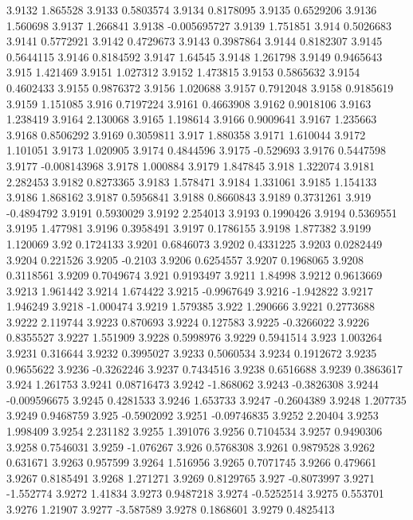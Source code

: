 3.9132  1.865528
3.9133  0.5803574
3.9134  0.8178095
3.9135  0.6529206
3.9136  1.560698
3.9137  1.266841
3.9138  -0.005695727
3.9139  1.751851
3.914  0.5026683
3.9141  0.5772921
3.9142  0.4729673
3.9143  0.3987864
3.9144  0.8182307
3.9145  0.5644115
3.9146  0.8184592
3.9147  1.64545
3.9148  1.261798
3.9149  0.9465643
3.915  1.421469
3.9151  1.027312
3.9152  1.473815
3.9153  0.5865632
3.9154  0.4602433
3.9155  0.9876372
3.9156  1.020688
3.9157  0.7912048
3.9158  0.9185619
3.9159  1.151085
3.916  0.7197224
3.9161  0.4663908
3.9162  0.9018106
3.9163  1.238419
3.9164  2.130068
3.9165  1.198614
3.9166  0.9009641
3.9167  1.235663
3.9168  0.8506292
3.9169  0.3059811
3.917  1.880358
3.9171  1.610044
3.9172  1.101051
3.9173  1.020905
3.9174  0.4844596
3.9175  -0.529693
3.9176  0.5447598
3.9177  -0.008143968
3.9178  1.000884
3.9179  1.847845
3.918  1.322074
3.9181  2.282453
3.9182  0.8273365
3.9183  1.578471
3.9184  1.331061
3.9185  1.154133
3.9186  1.868162
3.9187  0.5956841
3.9188  0.8660843
3.9189  0.3731261
3.919  -0.4894792
3.9191  0.5930029
3.9192  2.254013
3.9193  0.1990426
3.9194  0.5369551
3.9195  1.477981
3.9196  0.3958491
3.9197  0.1786155
3.9198  1.877382
3.9199  1.120069
3.92  0.1724133
3.9201  0.6846073
3.9202  0.4331225
3.9203  0.0282449
3.9204  0.221526
3.9205  -0.2103
3.9206  0.6254557
3.9207  0.1968065
3.9208  0.3118561
3.9209  0.7049674
3.921  0.9193497
3.9211  1.84998
3.9212  0.9613669
3.9213  1.961442
3.9214  1.674422
3.9215  -0.9967649
3.9216  -1.942822
3.9217  1.946249
3.9218  -1.000474
3.9219  1.579385
3.922  1.290666
3.9221  0.2773688
3.9222  2.119744
3.9223  0.870693
3.9224  0.127583
3.9225  -0.3266022
3.9226  0.8355527
3.9227  1.551909
3.9228  0.5998976
3.9229  0.5941514
3.923  1.003264
3.9231  0.316644
3.9232  0.3995027
3.9233  0.5060534
3.9234  0.1912672
3.9235  0.9655622
3.9236  -0.3262246
3.9237  0.7434516
3.9238  0.6516688
3.9239  0.3863617
3.924  1.261753
3.9241  0.08716473
3.9242  -1.868062
3.9243  -0.3826308
3.9244  -0.009596675
3.9245  0.4281533
3.9246  1.653733
3.9247  -0.2604389
3.9248  1.207735
3.9249  0.9468759
3.925  -0.5902092
3.9251  -0.09746835
3.9252  2.20404
3.9253  1.998409
3.9254  2.231182
3.9255  1.391076
3.9256  0.7104534
3.9257  0.9490306
3.9258  0.7546031
3.9259  -1.076267
3.926  0.5768308
3.9261  0.9879528
3.9262  0.631671
3.9263  0.957599
3.9264  1.516956
3.9265  0.7071745
3.9266  0.479661
3.9267  0.8185491
3.9268  1.271271
3.9269  0.8129765
3.927  -0.8073997
3.9271  -1.552774
3.9272  1.41834
3.9273  0.9487218
3.9274  -0.5252514
3.9275  0.553701
3.9276  1.21907
3.9277  -3.587589
3.9278  0.1868601
3.9279  0.4825413
